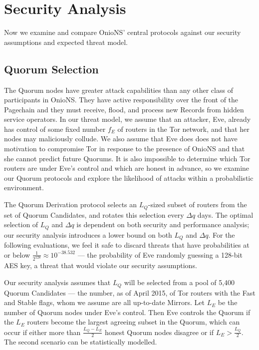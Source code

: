 \documentclass{sig-alternate}
\begin{document}
\section{Security Analysis}

Now we examine and compare OnioNS' central protocols against our security assumptions and expected threat model.



\subsection{Quorum Selection}

The Quorum nodes have greater attack capabilities than any other class of participants in OnioNS. They have active responsibility over the front of the Pagechain and they must receive, flood, and process new Records from hidden service operators. In our threat model, we assume that an attacker, Eve, already has control of some fixed number $ f_{E} $ of routers in the Tor network, and that her nodes may maliciously collude. We also assume that Eve does does not have motivation to compromise Tor in response to the presence of OnioNS and that she cannot predict future Quorums. It is also impossible to determine which Tor routers are under Eve's control and which are honest in advance, so we examine our Quorum protocols and explore the likelihood of attacks within a probabilistic environment.

The Quorum Derivation protocol selects an $ L_{Q} $-sized subset of routers from the set of Quorum Candidates, and rotates this selection every $ \Delta q $ days. The optimal selection of $ L_{Q} $ and $ \Delta q $ is dependent on both security and performance analysis; our security analysis introduces a lower bound on both $ L_{Q} $ and $ \Delta q $. For the following evaluations, we feel it safe to discard threats that have probabilities at or below $ \frac{1}{2^{128}} \approx 10^{-38.532} $ --- the probability of Eve randomly guessing a 128-bit AES key, a threat that would violate our security assumptions.

Our security analysis assumes that $ L_{Q} $ will be selected from a pool of 5,400 Quorum Candidates --- the number, as of April 2015, of Tor routers with the Fast and Stable flags, whom we assume are all up-to-date Mirrors. Let $ L_{E} $ be the number of Quorum nodes under Eve's control. Then Eve controls the Quorum if the $ L_{E} $ routers become the largest agreeing subset in the Quorum, which can occur if either more than $ \frac{L_{Q} - L_{E}}{2} $ honest Quorum nodes disagree or if $ L_{E} > \frac{L_{Q}}{2} $. The second scenario can be statistically modelled.
\end{document}
